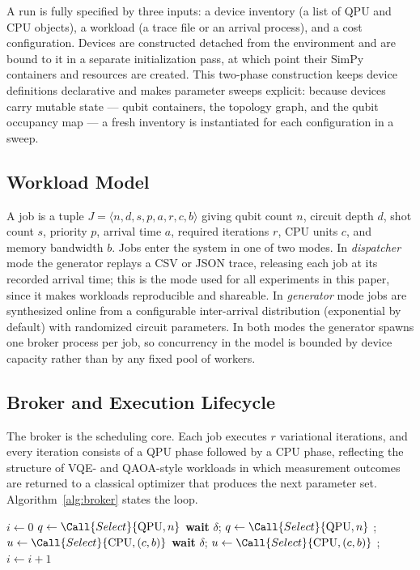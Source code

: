 A run is fully specified by three inputs: a device inventory (a list of QPU and
CPU objects), a workload (a trace file or an arrival process), and a cost
configuration. Devices are constructed detached from the environment and are
bound to it in a separate initialization pass, at which point their SimPy
containers and resources are created. This two-phase construction keeps device
definitions declarative and makes parameter sweeps explicit: because devices
carry mutable state --- qubit containers, the topology graph, and the qubit
occupancy map --- a fresh inventory is instantiated for each configuration in a
sweep.

\subsection{Workload Model}
\label{sec:arch-workload}

A job is a tuple
$J=\langle n, d, s, p, a, r, c, b\rangle$
giving qubit count $n$, circuit depth $d$, shot count $s$, priority $p$,
arrival time $a$, required iterations $r$, CPU units $c$, and memory bandwidth
$b$. Jobs enter the system in one of two modes. In \emph{dispatcher} mode the
generator replays a CSV or JSON trace, releasing each job at its recorded
arrival time; this is the mode used for all experiments in this paper, since it
makes workloads reproducible and shareable. In \emph{generator} mode jobs are
synthesized online from a configurable inter-arrival distribution
(exponential by default) with randomized circuit parameters. In both modes the
generator spawns one broker process per job, so concurrency in the model is
bounded by device capacity rather than by any fixed pool of workers.

\subsection{Broker and Execution Lifecycle}
\label{sec:arch-broker}

The broker is the scheduling core. Each job executes $r$ variational
iterations, and every iteration consists of a QPU phase followed by a CPU
phase, reflecting the structure of VQE- and QAOA-style workloads in which
measurement outcomes are returned to a classical optimizer that produces the
next parameter set. Algorithm~\ref{alg:broker} states the loop.

\begin{algorithm}[t]
\caption{Broker process for job $J$}
\label{alg:broker}
\begin{algorithmic}[1]
\State $i \gets 0$
  \State $q \gets \Call{Select}{\text{QPU}, n}$
   
    \State \textbf{wait} $\delta$; \quad $q \gets \Call{Select}{\text{QPU}, n}$
  \EndWhile
  \State {}; \quad {}
  \State $u \gets \Call{Select}{\text{CPU}, (c,b)}$
    \State \textbf{wait} $\delta$; \quad $u \gets \Call{Select}{\text{CPU}, (c,b)}$
  \EndWhile
  \State {}; \quad {}
  \State $i \gets i + 1$
\EndWhile
\State {}
\end{algorithmic}
\end{algorithm}

